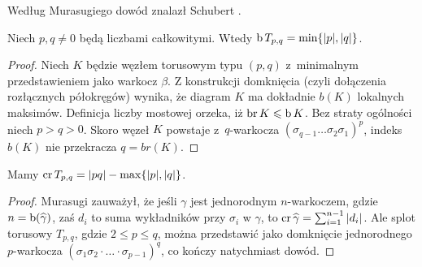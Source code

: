 Według Murasugiego \cite[s. 150]{murasugi96} dowód znalazł Schubert \cite{schubert54}.
%

\begin{corollary}
%
\label{cor:torus_braid_number}%
    Niech $p, q \neq 0$ będą liczbami całkowitymi.
    Wtedy $\operatorname{b} T_{p, q} = \min \{|p|, |q|\}$.
\end{corollary}

\begin{proof}
    Niech $K$ będzie węzłem torusowym typu $(p,q)$ z~minimalnym przedstawieniem jako warkocz $\beta$.
    Z konstrukcji domknięcia (czyli dołączenia rozłącznych półokręgów) wynika,
    że diagram $K$ ma dokładnie $b(K)$ lokalnych maksimów.
    Definicja liczby mostowej orzeka, iż $\operatorname{br} K \leqslant \operatorname{b} K$.
    Bez straty ogólności niech $p > q > 0$.
    Skoro węzeł $K$ powstaje z~$q$-warkocza $(\sigma_{q-1} \ldots \sigma_2\sigma_1)^p$,
    indeks $b(K)$ nie przekracza $q = br(K)$.
\end{proof}

\begin{proposition}
%
    Mamy $\operatorname{cr} T_{p, q} = |pq| - \max\{|p|, |q|\}$.
\end{proposition}
    
\begin{proof}
%
    Murasugi \cite[s. 255]{murasugi91} zauważył, że jeśli $\gamma$ jest jednorodnym $n$-warkoczem, gdzie $n = \operatorname{b}(\widehat{\gamma})$, zaś $d_i$ to suma wykładników przy $\sigma_i$ w $\gamma$, to $\operatorname{cr} \widehat{\gamma} = \sum_{i=1}^{n-1} |d_i|$.
    Ale splot torusowy $T_{p, q}$, gdzie $2 \le p \le q$, można przedstawić jako domknięcie jednorodnego $p$-warkocza $(\sigma_1 \sigma_2 \cdot \ldots \cdot \sigma_{p-1})^q$, co kończy natychmiast dowód.
\end{proof}

